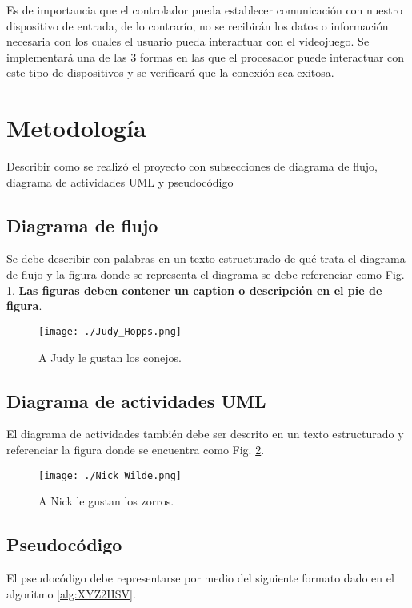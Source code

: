 \documentclass[preprint,12pt]{elsarticle}
\begin{document}
Es de importancia que el controlador pueda establecer comunicación con nuestro dispositivo de entrada, de lo contrarío, no se recibirán los datos o información necesaria con los cuales el usuario pueda interactuar con el videojuego. Se implementará una de las 3 formas en las que el procesador puede interactuar con este tipo de dispositivos y se verificará que la conexión sea exitosa.

\section{Metodología}
\label{sec:metod}

Describir como se realizó el proyecto con subsecciones de diagrama de flujo, diagrama de actividades UML y pseudocódigo

\subsection{Diagrama de flujo}
Se debe describir con palabras en un texto estructurado de qué trata el diagrama de flujo y la figura donde se representa el diagrama se debe referenciar como Fig. \ref{fig:Judy}. \textbf{Las figuras deben contener un caption o descripción en el pie de figura}.

\begin{figure}[ht!]
\centering\texttt{[image: ./Judy\_Hopps.png]}
\caption{A Judy le gustan los conejos.}
\label{fig:Judy}
\end{figure}

\subsection{Diagrama de actividades UML}
El diagrama de actividades también debe ser descrito en un texto estructurado y referenciar la figura donde se encuentra como Fig. \ref{fig:Nick}.

\begin{figure}[ht!]
\centering\texttt{[image: ./Nick\_Wilde.png]}
\caption{A Nick le gustan los zorros.}
\label{fig:Nick}
\end{figure}

\subsection{Pseudocódigo}
El pseudocódigo debe representarse por medio del siguiente formato dado en el algoritmo \ref{alg:XYZ2HSV}.
\end{document}
